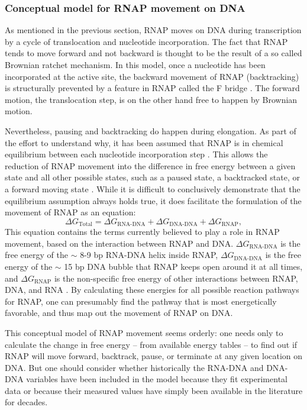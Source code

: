 %

\subsubsection{Conceptual model for RNAP movement on DNA}
As mentioned in the previous section, RNAP moves on DNA during transcription by
a cycle of translocation and nucleotide incorporation. The fact that RNAP tends
to move forward and not backward is thought to be the result of a so called
Brownian ratchet mechanism. In this model, once a nucleotide has been
incorporated at the active site, the backward movement of RNAP (backtracking)
is structurally prevented by a feature in RNAP called the F bridge
\cite{bar-nahum_ratchet_2005}. The forward motion, the translocation step, is
on the other hand free to happen by Brownian motion. 

Nevertheless, pausing and backtracking do happen during elongation. As part of
the effort to understand why, it has been assumed that RNAP is in chemical
equilibrium between each nucleotide incorporation step
\cite{greive_thinking_2005}. This allows the reduction of RNAP movement into
the difference in free energy between a given state and all other possible
states, such as a paused state, a backtracked state, or a forward moving state
\cite{greive_thinking_2005}. While it is difficult to conclusively demonstrate
that the equilibrium assumption always holds true, it does facilitate the
formulation of the movement of RNAP as an equation:
\begin{equation}
	\Delta G_{\text{Total}} = \Delta G_{\text{RNA-DNA}} + \Delta
	G_{\text{DNA-DNA}} + \Delta G_{\text{RNAP}},
	\label{eq:rnap_energy_balance}
\end{equation}
This equation contains the terms currently believed to play a role in RNAP
movement, based on the interaction between RNAP and DNA. $\Delta
G_{\text{RNA-DNA}}$ is the free energy of the $\sim$ 8-9 bp RNA-DNA helix
inside RNAP, $\Delta G_{\text{DNA-DNA}}$ is the free energy of the $\sim$ 15 bp
DNA bubble that RNAP keeps open around it at all times, and $\Delta
G_{\text{RNAP}}$ is the non-specific free energy of other interactions between
RNAP, DNA, and RNA \cite{greive_thinking_2005}. By calculating these energies
for all possible reaction pathways for RNAP, one can presumably find the
pathway that is most energetically favorable, and thus map out the movement of
RNAP on DNA.

This conceptual model of RNAP movement seems orderly: one needs only to
calculate the change in free energy -- from available energy tables -- to find
out if RNAP will move forward, backtrack, pause, or terminate at any given
location on DNA. But one should consider whether historically the RNA-DNA and
DNA-DNA variables have been included in the model because they fit experimental
data or because their measured values have simply been available in the
literature for decades.

